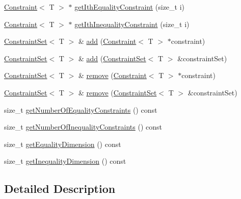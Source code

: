 \begin{DoxyCompactItemize}
\item 
\hyperlink{classocra_1_1Constraint}{Constraint}$<$ T $>$ $\ast$ \hyperlink{classocra_1_1ConstraintSet_a5b7d67d57cc92ade65d84fe36d94bbe0}{get\+Ith\+Equality\+Constraint} (size\+\_\+t i)
\item 
\hyperlink{classocra_1_1Constraint}{Constraint}$<$ T $>$ $\ast$ \hyperlink{classocra_1_1ConstraintSet_af0de2bdd6267da2c53e7c9b3045dfb74}{get\+Ith\+Inequality\+Constraint} (size\+\_\+t i)
\item 
\hyperlink{classocra_1_1ConstraintSet}{Constraint\+Set}$<$ T $>$ \& \hyperlink{classocra_1_1ConstraintSet_a56204ca335c5e235629cfbc8d68397ac}{add} (\hyperlink{classocra_1_1Constraint}{Constraint}$<$ T $>$ $\ast$constraint)
\item 
\hyperlink{classocra_1_1ConstraintSet}{Constraint\+Set}$<$ T $>$ \& \hyperlink{classocra_1_1ConstraintSet_a4e0ff725278438f2f595ebc0a5de4389}{add} (\hyperlink{classocra_1_1ConstraintSet}{Constraint\+Set}$<$ T $>$ \&constraint\+Set)
\item 
\hyperlink{classocra_1_1ConstraintSet}{Constraint\+Set}$<$ T $>$ \& \hyperlink{classocra_1_1ConstraintSet_a6f0c43b34ff1ea60911a10186c66f294}{remove} (\hyperlink{classocra_1_1Constraint}{Constraint}$<$ T $>$ $\ast$constraint)
\item 
\hyperlink{classocra_1_1ConstraintSet}{Constraint\+Set}$<$ T $>$ \& \hyperlink{classocra_1_1ConstraintSet_a78f8d0f6f919734bb915bf6f63f5f058}{remove} (\hyperlink{classocra_1_1ConstraintSet}{Constraint\+Set}$<$ T $>$ \&constraint\+Set)
\item 
size\+\_\+t \hyperlink{classocra_1_1ConstraintSet_a95a113a808dfbf7a407c1ce000403941}{get\+Number\+Of\+Equality\+Constraints} () const
\item 
size\+\_\+t \hyperlink{classocra_1_1ConstraintSet_ae8c7be6697c295e051550e225f6fe85b}{get\+Number\+Of\+Inequality\+Constraints} () const
\item 
size\+\_\+t \hyperlink{classocra_1_1ConstraintSet_adc4069c30e8a497d88e930d68fc1ac57}{get\+Equality\+Dimension} () const
\item 
size\+\_\+t \hyperlink{classocra_1_1ConstraintSet_a3d0134190b555f7176a719424c0401eb}{get\+Inequality\+Dimension} () const
\end{DoxyCompactItemize}



\subsection{Detailed Description}
